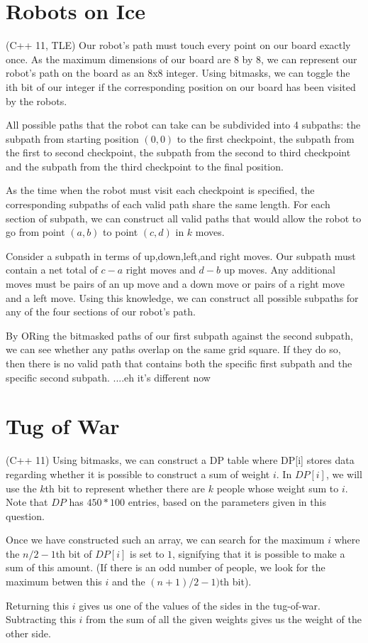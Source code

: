 \documentclass{article}
\begin{document}
\section{Robots on Ice}
(C++ 11, TLE) Our robot's path must touch every point on our board exactly once. As the maximum dimensions of our board are 8 by 8, we can represent our robot's path on the board as an 8x8 integer. Using bitmasks, we can toggle the ith bit of our integer if the corresponding position on our board has been visited by the robots.
\par 
All possible paths that the robot can take can be subdivided into 4 subpaths: the subpath from starting position $(0,0)$ to the first checkpoint, the subpath from the first to second checkpoint, the subpath from the second to third checkpoint and the subpath from the third checkpoint to the final position.
\par 
As the time when the robot must visit each checkpoint is specified, the corresponding subpaths of each valid path share the same length. For each section of subpath, we can construct all valid paths that would allow the robot to go from point $(a,b)$ to point $(c,d)$ in $k$ moves.
\par 
Consider a subpath in terms of up,down,left,and right moves. Our subpath must contain a net total of $c-a$ right moves and $d-b$ up moves. Any additional moves must be pairs of an up move and a down move or pairs of a right move and a left move. Using this knowledge, we can construct all possible subpaths for any of the four sections of our robot's path.
\par 
By ORing the bitmasked paths of our first subpath against the second subpath, we can see whether any paths overlap on the same grid square. If they do so, then there is no valid path that contains both the specific first subpath and the specific second subpath.
....eh it's different now

\section{Tug of War}
(C++ 11) Using bitmasks, we can construct a DP table where DP[i] stores data regarding whether it is possible to construct a sum of weight $i$. In $DP[i]$, we will use the $k$th bit to represent whether there are $k$ people whose weight sum to $i$. Note that $DP$ has $450*100$ entries, based on the parameters given in this question.
\par 
Once we have constructed such an array, we can search for the maximum $i$ where the $n/2-1$th bit of $DP[i]$ is set to $1$, signifying that it is possible to make a sum of this amount. (If there is an odd number of people, we look for the maximum betwen this $i$ and the $(n+1)/2 - 1)$th bit).
\par 
Returning this $i$ gives us one of the values of the sides in the tug-of-war. Subtracting this $i$ from the sum of all the given weights gives us the weight of the other side.
\end{document}
